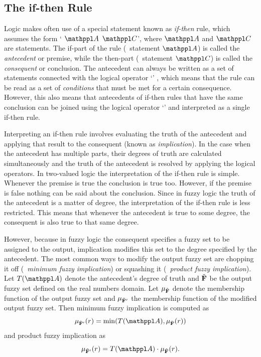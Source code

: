 \subsection{The if-then Rule}
\label{sec:fuzzyModelling:ifthen}
Logic makes often use of a special statement known as \emph{if-then} rule, which assumes the form ` $\statement{A}$  $\statement{C}$', where $\statement{A}$ and $\statement{C}$ are statements. The if-part of the rule (\ie\ statement $\statement{A}$) is called the \emph{antecedent} or premise, while the then-part (\ie\ statement $\statement{C}$) is called the \emph{consequent} or conclusion. The antecedent can always be written as a set of statements connected with the logical operator `' \cite{mendel:2001}, which means that the rule can be read as a set of \emph{conditions} that must be met for a certain consequence. However, this also means that antecedents of if-then rules that have the same conclusion can be joined using the logical operator `' and interpreted as a single if-then rule. 

Interpreting an if-then rule involves evaluating the truth of the antecedent and app\-ly\-ing that result to the consequent (known as \emph{implication}). In the case when the antecedent has multiple parts, their degrees of truth are calculated simultaneously and the truth of the antecedent is resolved by applying the logical operators. In two-valued logic the interpretation of the if-then rule is simple. Whenever the premise is true the conclusion is true too. However, if the premise is false nothing can be said about the conclusion. Since in fuzzy logic the truth of the antecedent is a matter of degree, the interpretation of the if-then rule is less restricted. This means that whenever the antecedent is true to some degree, the consequent is also true to that same degree. 

However, because in fuzzy logic the consequent specifies a fuzzy set to be assigned to the output, implication modifies this set to the degree specified by the antecedent. The most common ways to modify the output fuzzy set are chopping it off (\ie\ \emph{minimum fuzzy implication}) or squashing it (\ie\ \emph{product fuzzy implication}). Let $T(\statement{A})$ denote the antecedent's degree of truth and ${\tilde{{\mathbf{F}}}}$ be the output fuzzy set defined on the real numbers domain. Let $\mu_{\tilde{{\mathbf{F}}}}$ denote the membership function of the output fuzzy set and $\mu_{{\tilde{{\mathbf{F}}}}'}$ the membership function of the modified output fuzzy set. Then minimum fuzzy implication is computed as
%
\begin{equation} 
\mu_{\fset{F}'}(r)=\min(T(\statement{A}),\mu_\fset{F}(r))
\end{equation}
%
and product fuzzy implication as
%
\begin{equation}
\mu_{\fset{F}'}(r)=T(\statement{A})\cdot\mu_\fset{F}(r).
\end{equation}

